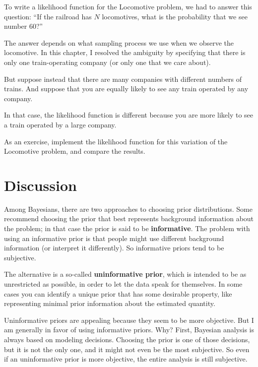 \documentclass[12pt]{book}
\begin{document}
\begin{exercise}
To write a likelihood function for the Locomotive problem, we had
to answer this question:  ``If the railroad has $N$ locomotives, what
is the probability that we see number 60?''

The answer depends on what sampling process we use when we observe the
locomotive.  In this chapter, I resolved the ambiguity by specifying
that there is only one train-operating company (or only one that we
care about).

But suppose instead that there are many companies with different
numbers of trains.  And suppose that you are equally likely to see any
train operated by any company.

In that case, the likelihood function is different because you
are more likely to see a train operated by a large company.

As an exercise, implement the likelihood function for this variation
of the Locomotive problem, and compare the results.

\end{exercise}


\section{Discussion}

Among Bayesians, there are two approaches to choosing prior
distributions.  Some recommend choosing the prior that best represents
background information about the problem; in that case the prior
is said to be {\bf informative}.  The problem with using an informative
prior is that people might use different background information (or
interpret it differently).  So informative priors tend to be subjective.

The alternative is a so-called {\bf uninformative prior}, which is
intended to be as unrestricted as possible, in order to let the data
speak for themselves.  In some cases you can identify a unique prior
that has some desirable property, like representing minimal prior
information about the estimated quantity.

Uninformative priors are appealing because they seem to be more
objective.  But I am generally in favor of using informative priors.
Why?  First, Bayesian analysis is always based on
modeling decisions.  Choosing the prior is one of those decisions, but
it is not the only one, and it might not even be the most subjective.
So even if an uninformative prior is more objective, the entire analysis
is still subjective.
\end{document}
